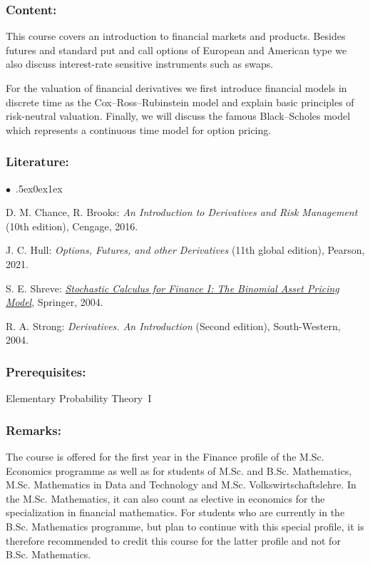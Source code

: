 \documentclass[a4paper,10pt]{article}
\renewenvironment{itemize}{\begin{list}{$\bullet$\ }{\itemsep.5ex\setlength{\topsep}{0.5\itemsep}\parsep0ex\labelsep1ex\settowidth{\labelwidth}{$\bullet$\ }\setlength{\leftmargin}{\labelwidth}\addtolength{\leftmargin}{3ex}\addtolength{\leftmargin}{\labelsep}}}{\end{list}}
\begin{document}
\subsubsection*{\large
    Content:
}
This course covers an introduction to financial markets and products. Besides futures and standard put and call options
of European and American type we also discuss interest-rate sensitive instruments such as swaps.

For the valuation of financial derivatives we first introduce financial models in discrete time as the Cox--Ross--Rubinstein
model and explain basic principles of risk-neutral valuation. Finally, we will discuss the famous Black--Scholes model
which represents a continuous time model for option pricing.
\subsubsection*{\large
    Literature:
}
\begin{itemize}
\item
D. M. Chance, R. Brooks: \emph{An Introduction to Derivatives and Risk Management} (10th edition), Cengage, 2016. 
\item
J. C. Hull: \emph{Options, Futures, and other Derivatives} (11th global edition), Pearson, 2021.
\item 
S. E. Shreve: \href{https://link.springer.com/book/10.1007/978-0-387-22527-2}{\emph{Stochastic Calculus for Finance I: The Binomial Asset Pricing Model}}, Springer, 2004. 
\item 
R. A. Strong: \emph{Derivatives. An Introduction} (Second edition), South-Western, 2004.
\end{itemize}
\subsubsection*{\large
    Prerequisites:
}
Elementary Probability Theory~I
\subsubsection*{\large
    Remarks:
}
The course  is offered for the first year in the Finance profile of the M.Sc. Economics programme as well as for students of M.Sc. and B.Sc. Mathematics, M.Sc. Mathematics in Data and Technology and M.Sc. Volkswirtschaftslehre. In the M.Sc. Mathematics, it can also count as elective in economics for the specialization in financial mathematics. For students who are currently in the B.Sc. Mathematics programme, but plan to continue with this special profile, it is therefore recommended to credit this course for the latter profile and not for B.Sc. Mathematics.
\cleardoublepage
\end{document}
